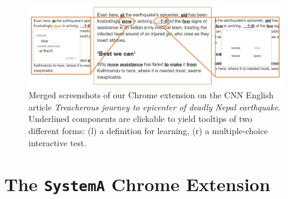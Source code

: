 
\begin{figure}[ht]
\centering
\includegraphics[width=0.99\textwidth]{chrome_extension.jpg}
\caption{Merged screenshots of our Chrome extension on the CNN English
  article {\it Treacherous journey to epicenter of deadly Nepal
    earthquake}.  Underlined components are clickable to yield
  tooltips of two different forms: (l) a definition for learning, (r)
  a multiple-choice interactive test.}
\label{fig:chrome_extension_1}
\end{figure}

\section{The {\tt SystemA} Chrome Extension}


